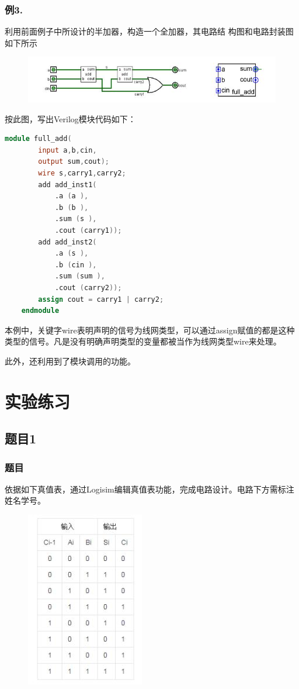 \documentclass[UTF8]{article}
\begin{document}
	\subsubsection*{例3.}利用前面例子中所设计的半加器，构造一个全加器，其电路结
	构图和电路封装图如下所示\par
	\begin{figure}[H]
		\centering
		\includegraphics[scale=0.7]{adder.jpg}
		\label{adder}
	\end{figure}
	按此图，写出Verilog模块代码如下：\par
	\begin{lstlisting}[language=Verilog]
	module full_add(
		input a,b,cin,
		output sum,cout);
		wire s,carry1,carry2;
		add add_inst1(
			.a (a ),
			.b (b ),
			.sum (s ),
			.cout (carry1));
		add add_inst2(
			.a (s ),
			.b (cin ),
			.sum (sum ),
			.cout (carry2));
		assign cout = carry1 | carry2;
	endmodule
	\end{lstlisting}\par
	本例中，关键字wire表明声明的信号为线网类型，可以通过assign赋值的都是这种类型的信号。凡是没有明确声明类型的变量都被当作为线网类型wire来处理。\par
	此外，还利用到了模块调用的功能。\par
	
	
	\section{实验练习}
	
	\subsection{题目1}
	\subsubsection{题目}
	依据如下真值表，通过Logisim编辑真值表功能，完成电路设计。电路下方需标注姓名学号。\par
	\begin{figure}[h]
		\centering
		\includegraphics[scale=1]{Problem1_BoolTable.jpg}
		\label{Problem1_BoolTable}
	\end{figure}\par
\end{document}
